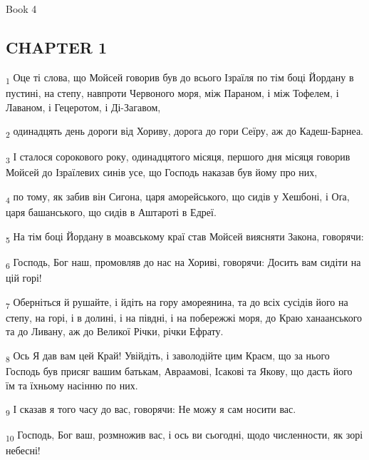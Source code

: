 Book 4
\subsection{CHAPTER 1}
\begin{tcolorbox}
\textsubscript{1} Оце ті слова, що Мойсей говорив був до всього Ізраїля по тім боці Йордану в пустині, на степу, навпроти Червоного моря, між Параном, і між Тофелем, і Лаваном, і Гецеротом, і Ді-Загавом,
\end{tcolorbox}
\begin{tcolorbox}
\textsubscript{2} одинадцять день дороги від Хориву, дорога до гори Сеїру, аж до Кадеш-Барнеа.
\end{tcolorbox}
\begin{tcolorbox}
\textsubscript{3} І сталося сорокового року, одинадцятого місяця, першого дня місяця говорив Мойсей до Ізраїлевих синів усе, що Господь наказав був йому про них,
\end{tcolorbox}
\begin{tcolorbox}
\textsubscript{4} по тому, як забив він Сигона, царя аморейського, що сидів у Хешбоні, і Оґа, царя башанського, що сидів в Аштароті в Едреї.
\end{tcolorbox}
\begin{tcolorbox}
\textsubscript{5} На тім боці Йордану в моавському краї став Мойсей виясняти Закона, говорячи:
\end{tcolorbox}
\begin{tcolorbox}
\textsubscript{6} Господь, Бог наш, промовляв до нас на Хориві, говорячи: Досить вам сидіти на цій горі!
\end{tcolorbox}
\begin{tcolorbox}
\textsubscript{7} Оберніться й рушайте, і йдіть на гору амореянина, та до всіх сусідів його на степу, на горі, і в долині, і на півдні, і на побережжі моря, до Краю ханаанського та до Ливану, аж до Великої Річки, річки Ефрату.
\end{tcolorbox}
\begin{tcolorbox}
\textsubscript{8} Ось Я дав вам цей Край! Увійдіть, і заволодійте цим Краєм, що за нього Господь був присяг вашим батькам, Авраамові, Ісакові та Якову, що дасть його їм та їхньому насінню по них.
\end{tcolorbox}
\begin{tcolorbox}
\textsubscript{9} І сказав я того часу до вас, говорячи: Не можу я сам носити вас.
\end{tcolorbox}
\begin{tcolorbox}
\textsubscript{10} Господь, Бог ваш, розмножив вас, і ось ви сьогодні, щодо численности, як зорі небесні!
\end{tcolorbox}
